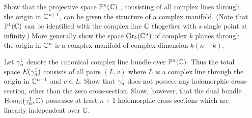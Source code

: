 \documentclass[../main]{subfiles}
\begin{document}
\begin{problem}
\label{prob:13.D} Show that the projective space $\mathbb{P}^n(\mathbb{C})$ , consisting of all complex lines through the origin in $\mathbb C^{n+1}$, can be given the structure of a complex manifold. (Note that $\mathbb{P}^1(\mathbb C)$ can be identified with the complex line $\mathbb C$ thogether with a single point at infinity.) More generally show the space $\operatorname{Gr}_k(\mathbb C^n)$ of complex $k$ planes through the origin in $\mathbb C^n$ is a complex manifold of complex dimension $k(n-k)$.
\end{problem}

\begin{problem}
\label{prob:13.E} Let $\gamma^1_n$ denote the canonical complex line bundle over $\mathbb{P}^n(\mathbb{C})$. Thus the total space $E(\gamma^1_n)$ consists of all pairs $(L,v)$ where $L$ is a complex line through the origin in $\mathbb C^{n+1}$ and $v\in L$. Show that $\gamma_n^1$ does not possess any holomorphic cross-section, other than the zero cross-section. Show, however, that the dual bundle $\operatorname{Hom}_\mathbb C(\gamma_n^1,\mathbb C)$ possesses at least $n+1$ holomorphic cross-sections which are linearly independent over $\mathbb C$.
\end{problem}
\end{document}
